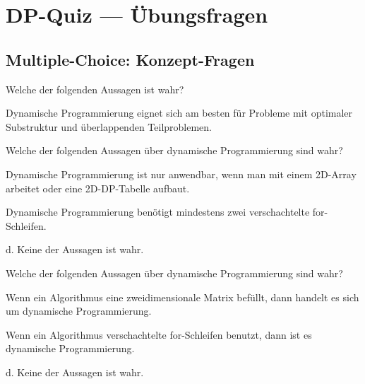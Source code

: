 %      
\section{DP-Quiz — Übungsfragen}\label{sec:13-dp-quiz}

\subsection{Multiple-Choice: Konzept-Fragen}\label{sec:13-welche-aussage-ist-korrekt}

\begin{contentbox}
Welche der folgenden Aussagen ist wahr?
\begin{factlist}
    \item[c.] Dynamische Programmierung eignet sich am besten für Probleme mit optimaler Substruktur und überlappenden Teilproblemen.
\end{factlist}
\end{contentbox}


\begin{contentbox}
Welche der folgenden Aussagen über dynamische Programmierung sind wahr?
\begin{factlist}
    \item[(I)] Dynamische Programmierung ist nur anwendbar, wenn man mit einem 2D-Array arbeitet oder eine 2D-DP-Tabelle aufbaut.
    \item[(II)] Dynamische Programmierung benötigt mindestens zwei verschachtelte for-Schleifen.
    \item d. Keine der Aussagen ist wahr.
\end{factlist}
\end{contentbox}


\begin{contentbox}
Welche der folgenden Aussagen über dynamische Programmierung sind wahr?
\begin{factlist}
    \item[(I)] Wenn ein Algorithmus eine zweidimensionale Matrix befüllt, dann handelt es sich um dynamische Programmierung.
    \item[(II)] Wenn ein Algorithmus verschachtelte for-Schleifen benutzt, dann ist es dynamische Programmierung.
    \item d. Keine der Aussagen ist wahr.
\end{factlist}
\end{contentbox}



